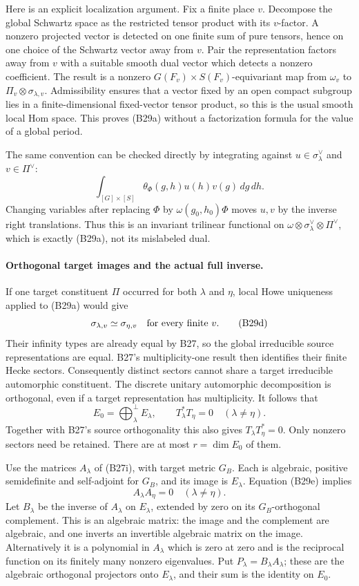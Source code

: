 \documentclass[11pt]{article}
\theoremstyle{definition}\newtheorem{definition}[theorem]{Definition}\newtheorem{remark}[theorem]{Remark}
\begin{document}
Here is an explicit localization argument.  Fix a
finite place $v$.  Decompose the global Schwartz space
as the restricted tensor product with its $v$-factor.
A nonzero projected vector is detected on one finite
sum of pure tensors, hence on one choice of the
Schwartz vector away from $v$.  Pair the representation
factors away from $v$ with a suitable smooth dual
vector which detects a nonzero coefficient.  The
result is a nonzero $G(F_v)\times S(F_v)$-equivariant
map from $\omega_v$ to $\Pi_v\otimes
\sigma_{\lambda,v}$.  Admissibility ensures that a
vector fixed by an open compact subgroup lies in a
finite-dimensional fixed-vector tensor product, so
this is the usual smooth local Hom space.  This
proves (B29a) without a factorization formula for
the value of a global period.

The same convention can be checked directly by
integrating against $u\in\sigma_\lambda^\vee$ and
$v\in\Pi^\vee$:
\[
 \int_{[G]\times[S]}\theta_\Phi(g,h)u(h)v(g)\,dg\,dh.
 \tag{B29c}
\]
Changing variables after replacing $\Phi$ by
$\omega(g_0,h_0)\Phi$ moves $u,v$ by the inverse
right translations.  Thus this is an invariant
trilinear functional on
$\omega\otimes\sigma_\lambda^\vee\otimes\Pi^\vee$,
which is exactly (B29a), not its mislabeled dual.

\paragraph{Orthogonal target images and the actual full inverse.}
If one target constituent $\Pi$ occurred for both
$\lambda$ and $\eta$, local Howe uniqueness applied
to (B29a) would give
\[
             \sigma_{\lambda,v}\simeq
                   \sigma_{\eta,v}
                   \quad\hbox{for every finite }v.
 \tag{B29d}
\]
Their infinity types are already equal by B27, so the
global irreducible source representations are equal.
B27's multiplicity-one result then identifies their
finite Hecke sectors.  Consequently distinct sectors
cannot share a target irreducible automorphic
constituent.  The discrete unitary automorphic
decomposition is orthogonal, even if a target
representation has multiplicity.  It follows that
\[
 E_0=\mathop{\bigoplus}^{\perp}_{\lambda}E_\lambda,
       \qquad T_\lambda^*T_\eta=0
                       \quad(\lambda\ne\eta).
 \tag{B29e}
\]
Together with B27's source orthogonality this also
gives $T_\lambda T_\eta^*=0$.
Only nonzero sectors need be retained.  There are
at most $r=\dim E_0$ of them.

Use the matrices $A_\lambda$ of (B27i), with target
metric $G_B$.  Each is algebraic, positive
semidefinite and self-adjoint for $G_B$, and its
image is $E_\lambda$.  Equation (B29e) implies
\[
           A_\lambda A_\eta=0\quad(\lambda\ne\eta).
 \tag{B29f}
\]
Let $B_\lambda$ be the inverse of $A_\lambda$ on
$E_\lambda$, extended by zero on its $G_B$-orthogonal
complement.  This is an algebraic matrix: the image
and the complement are algebraic, and one inverts
an invertible algebraic matrix on the image.
Alternatively it is a polynomial in $A_\lambda$
which is zero at zero and is the reciprocal function
on its finitely many nonzero eigenvalues.
Put $P_\lambda=B_\lambda A_\lambda$; these are the
algebraic orthogonal projectors onto $E_\lambda$,
and their sum is the identity on $E_0$.
\end{document}

